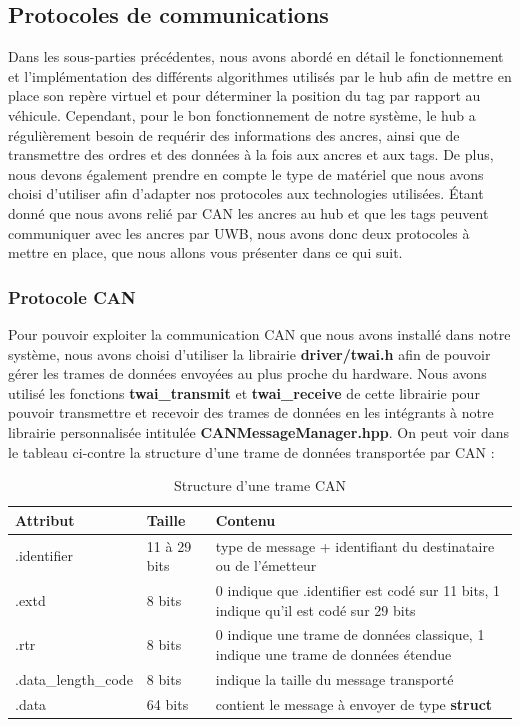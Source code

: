 \newpage
\subsection{Protocoles de communications}

Dans les sous-parties précédentes, nous avons abordé en détail le fonctionnement et l'implémentation des différents algorithmes utilisés par le hub afin de mettre en place son repère virtuel et pour déterminer la position du tag par rapport au véhicule. Cependant, pour le bon fonctionnement de notre système, le hub a régulièrement besoin de requérir des informations des ancres, ainsi que de transmettre des ordres et des données à la fois aux ancres et aux tags. De plus, nous devons également prendre en compte le type de matériel que nous avons choisi d'utiliser afin d'adapter nos protocoles aux technologies utilisées. Étant donné que nous avons relié par CAN les ancres au hub et que les tags peuvent communiquer avec les ancres par UWB, nous avons donc deux protocoles à mettre en place, que nous allons vous présenter dans ce qui suit.

\subsubsection{Protocole CAN}

Pour pouvoir exploiter la communication CAN que nous avons installé dans notre système, nous avons choisi d'utiliser la librairie {\ttfamily \textbf{driver/twai.h}} afin de pouvoir gérer les trames de données envoyées au plus proche du hardware. Nous avons utilisé les fonctions {\ttfamily \textbf{twai\_transmit}} et {\ttfamily \textbf{twai\_receive}} de cette librairie pour pouvoir transmettre et recevoir des trames de données en les intégrants à notre librairie personnalisée intitulée {\ttfamily \textbf{CANMessageManager.hpp}}. On peut voir dans le tableau ci-contre la structure d'une trame de données transportée par CAN :

\begin{table}[H]
    \centering
    \begin{tabular}{|l|l|p{7.5cm}|}
        \hline
        \textbf{Attribut} & \textbf{Taille} & \textbf{Contenu}\\
        \hline
        .identifier & 11 à 29 bits & type de message + identifiant du destinataire ou de l'émetteur\\
        \hline
        .extd & 8 bits & 0 indique que .identifier est codé sur 11 bits, 1 indique qu'il est codé sur 29 bits\\
        \hline
        .rtr & 8 bits & 0 indique une trame de données classique, 1 indique une trame de données étendue\\
        \hline
        .data\_length\_code & 8 bits & indique la taille du message transporté\\
        \hline
        .data & 64 bits & contient le message à envoyer de type {\ttfamily \textbf{struct}}\\
        \hline
    \end{tabular}
    \caption{Structure d'une trame CAN}
\end{table}

